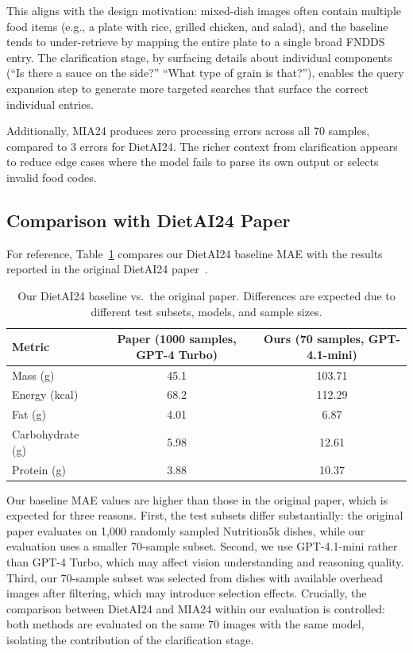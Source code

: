 \documentclass[11pt]{article}
\begin{document}
This aligns with the design motivation: mixed-dish images often contain multiple food items (e.g., a plate with rice, grilled chicken, and salad), and the baseline tends to under-retrieve by mapping the entire plate to a single broad FNDDS entry.
The clarification stage, by surfacing details about individual components (``Is there a sauce on the side?'' ``What type of grain is that?''), enables the query expansion step to generate more targeted searches that surface the correct individual entries.

Additionally, MIA24 produces zero processing errors across all 70 samples, compared to 3 errors for DietAI24.
The richer context from clarification appears to reduce edge cases where the model fails to parse its own output or selects invalid food codes.

\subsection{Comparison with DietAI24 Paper}

For reference, Table~\ref{tab:paper_comparison} compares our DietAI24 baseline MAE with the results reported in the original DietAI24 paper~\citep{yan2025dietai24}.

\begin{table}[H]
\centering
\caption{Our DietAI24 baseline vs.\ the original paper. Differences are expected due to different test subsets, models, and sample sizes.}
\label{tab:paper_comparison}
\vspace{0.5em}
\begin{tabular}{lcc}
\toprule
\textbf{Metric} & \textbf{Paper} (1000 samples, GPT-4 Turbo) & \textbf{Ours} (70 samples, GPT-4.1-mini) \\
\midrule
Mass (g)          & 45.1  & 103.71 \\
Energy (kcal)     & 68.2  & 112.29 \\
Fat (g)           & 4.01  & 6.87   \\
Carbohydrate (g)  & 5.98  & 12.61  \\
Protein (g)       & 3.88  & 10.37  \\
\bottomrule
\end{tabular}
\end{table}

Our baseline MAE values are higher than those in the original paper, which is expected for three reasons.
First, the test subsets differ substantially: the original paper evaluates on 1,000 randomly sampled Nutrition5k dishes, while our evaluation uses a smaller 70-sample subset.
Second, we use GPT-4.1-mini rather than GPT-4 Turbo, which may affect vision understanding and reasoning quality.
Third, our 70-sample subset was selected from dishes with available overhead images after filtering, which may introduce selection effects.
Crucially, the comparison between DietAI24 and MIA24 within our evaluation is controlled: both methods are evaluated on the same 70 images with the same model, isolating the contribution of the clarification stage.
\end{document}
